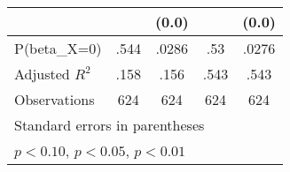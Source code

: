 \begin{tabular}{l*{4}{c}}
                &                  &    (0.0)         &                  &    (0.0)         \\
\hline
P(beta\_X=0)     &     .544         &    .0286         &      .53         &    .0276         \\
Adjusted \(R^{2}\)&     .158         &     .156         &     .543         &     .543         \\
Observations    &      624         &      624         &      624         &      624         \\
\hline\hline
\multicolumn{5}{l}{\footnotesize Standard errors in parentheses}\\
\multicolumn{5}{l}{\footnotesize \sym{*} \(p<0.10\), \sym{**} \(p<0.05\), \sym{***} \(p<0.01\)}\\
\end{tabular}
